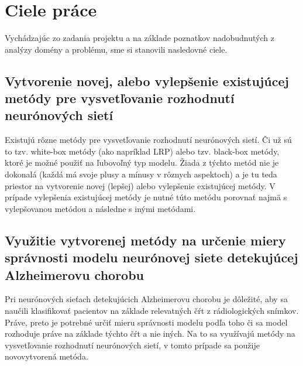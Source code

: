 \chapter{Ciele práce \label{sec:goals}}

Vychádzajúc zo zadania projektu a na základe poznatkov nadobudnutých z analýzy domény a problému, sme si stanovili nasledovné ciele.

\section{Vytvorenie novej, alebo vylepšenie existujúcej metódy pre vysvetľovanie rozhodnutí neurónových sietí \label{sec:goals_1}} 

Existujú rôzne metódy pre vysvetľovanie rozhodnutí neurónových sietí. Či už sú to tzv. white-box metódy (ako napríklad LRP) alebo tzv. black-box metódy, ktoré je možné použiť na ľubovoľný typ modelu. Žiada z týchto metód nie je dokonalá (každá má svoje plusy a mínusy v rôznych aspektoch) a je tu teda priestor na vytvorenie novej (lepšej) alebo vylepšenie existujúcej metódy. V prípade vylepšenia existujúcej metódy je nutné túto metódu porovnať najmä s vylepšovanou metódou a následne s inými metódami.

\section{Využitie vytvorenej metódy na určenie miery správnosti modelu neurónovej siete detekujúcej Alzheimerovu chorobu \label{sec:goals_2}}

Pri neurónových sieťach detekujúcich Alzheimerovu chorobu je dôležité, aby sa naučili klasifikovať pacientov na základe relevatných čŕt z rádiologických snímkov. Práve, preto je potrebné určiť mieru správnosti modelu podľa toho či sa model rozhoduje práve na základe týchto čŕt a nie iných. Na to sa využívajú metódy na vysvetľovanie rozhodnutí neurónových sietí, v tomto prípade sa použije novovytvorená metóda.
